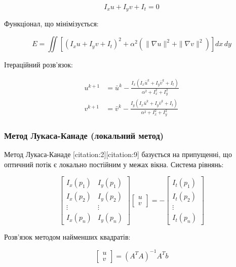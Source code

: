 \documentclass[14pt, a4paper]{extarticle}
\numberwithin{equation}{section}
\begin{document}
\begin{equation}
I_x u + I_y v + I_t = 0 \tag{17}
\end{equation}

Функціонал, що мінімізується:

\begin{equation}
E = \iint \left[(I_x u + I_y v + I_t)^2 + \alpha^2 \left( \|\nabla u\|^2 + \|\nabla v\|^2 \right) \right] dx\,dy \tag{18}
\end{equation}

Ітераційний розв'язок:

\begin{align}
u^{k+1} &= \bar{u}^k - \frac{I_x (I_x \bar{u}^k + I_y \bar{v}^k + I_t)}{\alpha^2 + I_x^2 + I_y^2} \tag{19} \\
v^{k+1} &= \bar{v}^k - \frac{I_y (I_x \bar{u}^k + I_y \bar{v}^k + I_t)}{\alpha^2 + I_x^2 + I_y^2} \tag{20}
\end{align}

\subsubsection{Метод Лукаса-Канаде (локальний метод)}

Метод Лукаса-Канаде [citation:2][citation:9] базується на припущенні, що оптичний потік є локально постійним у межах вікна. Система рівнянь:

\begin{equation}
\begin{bmatrix} 
I_x(p_1) & I_y(p_1) \\ 
I_x(p_2) & I_y(p_2) \\ 
\vdots & \vdots \\ 
I_x(p_n) & I_y(p_n) 
\end{bmatrix} 
\begin{bmatrix} u \\ v \end{bmatrix} = 
-\begin{bmatrix} I_t(p_1) \\ I_t(p_2) \\ \vdots \\ I_t(p_n) \end{bmatrix} \tag{21}
\end{equation}

Розв'язок методом найменших квадратів:

\begin{equation}
\begin{bmatrix} u \\ v \end{bmatrix} = (A^T A)^{-1} A^T b \tag{22}
\end{equation}
\end{document}
